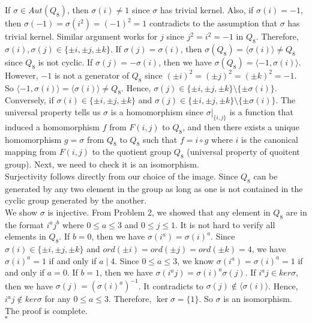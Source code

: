 \documentclass[12pt]{amsart}
\begin{document}
If $\sigma\in Aut(Q_8)$, then $\sigma(i)\neq 1$ since $\sigma$ has trivial kernel. Also, if $\sigma(i)=-1$, then $\sigma(-1)=\sigma(i^2)=(-1)^2=1$ contradicts to the assumption that $\sigma$ has trivial kernel. Similar argument works for $j$ since $j^2=i^2=-1$ in $Q_8$. Therefore, $\sigma(i),\sigma(j)\in \{\pm i,\pm j,\pm k\}$. If $\sigma(j)=\sigma(i)$, then $\sigma(Q_8)=\langle \sigma(i)\rangle \neq Q_8$ since $Q_8$ is not cyclic. If $\sigma(j)=-\sigma(i)$, then we have $\sigma(Q_8)=\langle -1,\sigma(i)\rangle$. However, $-1$ is not a generator of $Q_8$ since $(\pm i)^2=(\pm j)^2=(\pm k)^2=-1$. So $\langle -1,\sigma(i)\rangle=\langle\sigma(i)\rangle\neq Q_8$. Hence, $\sigma(j)\in \{\pm i,\pm j,\pm k\}\setminus \{\pm \sigma(i)\}$.\\
Conversely, if $\sigma(i)\in \{\pm i,\pm j,\pm k\}$ and $\sigma(j)\in \{\pm i,\pm j,\pm k\}\setminus \{\pm \sigma(i)\}$. The universal property tells us $\sigma$ is a homomorphism since $\sigma|_{\{i,j\}}$ is a function that induced a homomorphism $f$ from $F(i,j)$ to $Q_8$, and then there exists a unique homomorphism $g=\sigma$ from $Q_8$ to $Q_8$ such that $f=i\circ g$ where $i$ is the canonical mapping from $F(i,j)$ to the quotient group $Q_8$ (universal property of quoitent group). Next, we need to check it is an isomorphism.\\
Surjectivity follows directly from our choice of the image. Since $Q_8$ can be generated by any two element in the group as long as one is not contained in the cyclic group generated by the another.\\
We show $\sigma$ is injective. From Problem 2, we showed that any element in $Q_8$ are in the format $i^aj^b$ where $0\leq a\leq 3$ and $0\leq j\leq1$. It is not hard to verify all elements in $Q_8$. If $b=0$, then we have $\sigma(i^a)=\sigma(i)^a$. Since $\sigma(i)\in \{\pm i,\pm j,\pm k\}$ and $ord(\pm i)=ord(\pm j)=ord(\pm k)=4$, we have $\sigma(i)^a=1$ if and only if $a\mid 4$. Since $0\leq a \leq 3$, we know $\sigma(i^a)=\sigma(i)^a=1$ if and only if $a=0$. If $b=1$, then we have $\sigma(i^aj)=\sigma(i)^a\sigma(j)$. If $i^aj\in ker\sigma$, then we have $\sigma(j)=(\sigma(i)^a)^{-1}$. It contradicts to $\sigma(j)\notin \langle \sigma(i)\rangle$. Hence, $i^aj\notin ker\sigma$ for any $0\leq a \leq 3$. Therefore, $\ker\sigma=\{1\}$. So $\sigma$ is an isomorphism. The proof is complete.
\\\phantom{qed}\hfill$\square$\\
\end{document}
